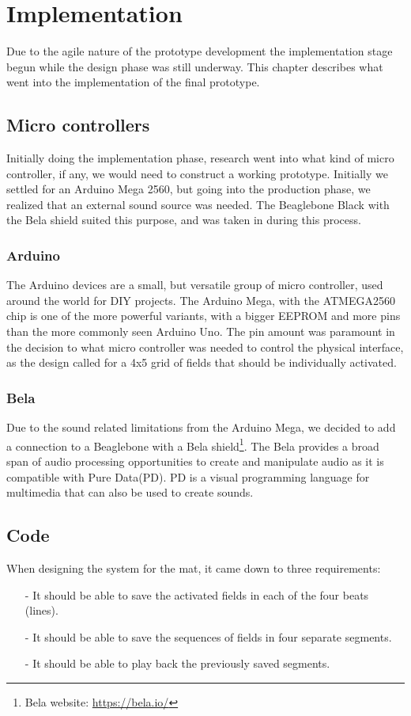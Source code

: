 \chapter{Implementation}%
Due to the agile nature of the prototype development the implementation stage begun while the design phase was still underway. This chapter describes what went into the implementation of the final prototype.

\section{Micro controllers}%
	Initially doing the implementation phase, research went into what kind of micro controller, if any, we would need to construct a working prototype. Initially we settled for an Arduino Mega 2560, but going into the production phase, we realized that an external sound source was needed. The Beaglebone Black with the Bela shield suited this purpose, and was taken in during this process.
	\subsection{Arduino}%
		The Arduino devices are a small, but versatile group of micro controller, used around the world for DIY projects. The Arduino Mega, with the ATMEGA2560 chip is one of the more powerful variants, with a bigger EEPROM and more pins than the more commonly seen Arduino Uno. The pin amount was paramount in the decision to what micro controller was needed to control the physical interface, as the design called for a 4x5 grid of fields that should be individually activated. 
		
	\subsection{Bela}%
		Due to the sound related limitations from the Arduino Mega, we decided to add a connection to a Beaglebone with a Bela shield\footnote{Bela website: \url{https://bela.io/}}. The Bela provides a broad span of audio processing opportunities to create and manipulate audio as it is compatible with Pure Data(PD). PD is a visual programming language for multimedia that can also be used to create sounds.
	
\section{Code}
	When designing the system for the mat, it came down to three requirements:
	\begin{itemize}
		\item[-] It should be able to save the activated fields in each of the four beats (lines).
		\item[-] It should be able to save the sequences of fields in four separate segments.
		\item[-] It should be able to play back the previously saved segments.
	\end{itemize}
